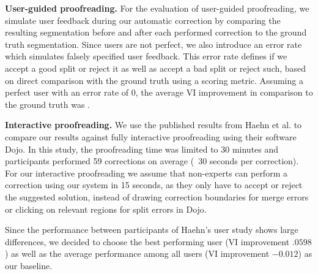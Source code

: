 
\textbf{User-guided proofreading.} For the evaluation of user-guided proofreading, we simulate user feedback during our automatic correction by comparing the resulting segmentation before and after each performed correction to the ground truth segmentation. Since users are not perfect, we also introduce an error rate which simulates falsely specified user feedback. This error rate defines if we accept a good split or reject it as well as accept a bad split or reject such, based on direct comparison with the ground truth using a scoring metric. Assuming a perfect user with an error rate of 0, the average VI improvement in comparison to the ground truth was .

\textbf{Interactive proofreading.} We use the published results from Haehn et al. to compare our results against fully interactive proofreading using their software Dojo. In this study, the proofreading time was limited to 30 minutes and participants performed 59 corrections on average (~30 seconds per correction). For our interactive proofreading we assume that  non-experts can perform a correction using our system in 15 seconds, as they only have to accept or reject the suggested solution, instead of drawing correction boundaries for merge errors or clicking on relevant regions for split errors in Dojo. 

Since the performance between participants of Haehn's user study shows large differences, we decided to choose the best performing user (VI improvement $.0598$) as well as the average performance among all users (VI improvement $-0.012$) as our baseline.

